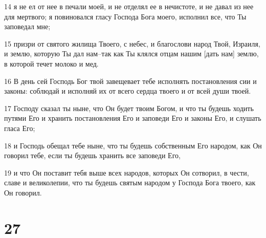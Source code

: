 \par 14 я не ел от нее в печали моей, и не отделял ее в нечистоте, и не давал из нее для мертвого; я повиновался гласу Господа Бога моего, исполнил все, что Ты заповедал мне;
\par 15 призри от святого жилища Твоего, с небес, и благослови народ Твой, Израиля, и землю, которую Ты дал нам--так как Ты клялся отцам нашим [дать нам] землю, в которой течет молоко и мед.
\par 16 В день сей Господь Бог твой завещевает тебе исполнять постановления сии и законы: соблюдай и исполняй их от всего сердца твоего и от всей души твоей.
\par 17 Господу сказал ты ныне, что Он будет твоим Богом, и что ты будешь ходить путями Его и хранить постановления Его и заповеди Его и законы Его, и слушать гласа Его;
\par 18 и Господь обещал тебе ныне, что ты будешь собственным Его народом, как Он говорил тебе, если ты будешь хранить все заповеди Его,
\par 19 и что Он поставит тебя выше всех народов, которых Он сотворил, в чести, славе и великолепии, что ты будешь святым народом у Господа Бога твоего, как Он говорил.

\chapter{27}

